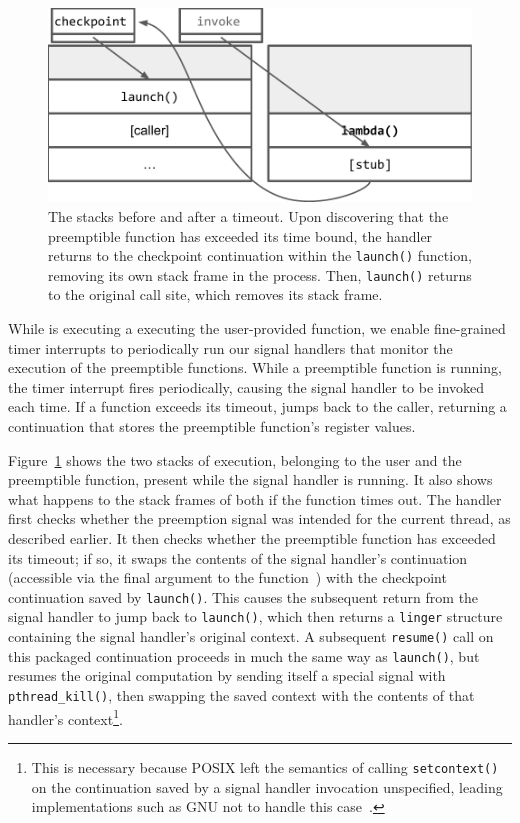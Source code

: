 \begin{figure}
\includegraphics[width=\columnwidth]{figs/twostacks}
\caption{The stacks before and after a timeout.  \textnormal{Upon discovering
that the preemptible function has exceeded its time bound, the handler returns to the
checkpoint continuation within the \texttt{launch()} function, removing its own stack
frame in the process.  Then, \texttt{launch()} returns to the original call site,
which removes its stack frame.}}
\label{fig:twostacks}
\end{figure}

While \libinger{} is executing a executing the user-provided function, we
enable fine-grained timer interrupts to periodically run our signal handlers
that monitor the execution of the preemptible functions. While a preemptible
function is running, the timer interrupt fires periodically, causing the signal
handler to be invoked each time. If a function exceeds its timeout, \libinger{}
jumps back to the caller, returning a continuation that stores the preemptible
function's register values.

Figure~\ref{fig:twostacks} shows the two stacks of execution, belonging to the
\libinger{} user and the preemptible function, present while the signal handler
is running. It also shows what happens to the stack frames of both if the
function times out. The handler first checks whether the preemption signal was
intended for the current thread, as described earlier.  It then checks whether
the preemptible function has exceeded its timeout; if so, it swaps the contents
of the signal handler's continuation (accessible via the final argument to the
function~\cite{sigaction-manpage}) with the checkpoint continuation saved by
\texttt{launch()}.  This causes the subsequent return from the signal handler
to jump back to \texttt{launch()}, which then returns a \texttt{linger}
structure containing the signal handler's original context.  A subsequent
\texttt{resume()} call on this packaged continuation proceeds in much the same
way as \texttt{launch()}, but resumes the original computation by sending
itself a special signal with \texttt{pthread\_kill()}, then swapping the saved
context with the contents of that handler's context\footnote{This is necessary
because POSIX left the semantics of calling \texttt{setcontext()} on the
continuation saved by a signal handler invocation unspecified, leading
implementations such as GNU not to handle this
case~\cite{getcontext-manpage}.}.

